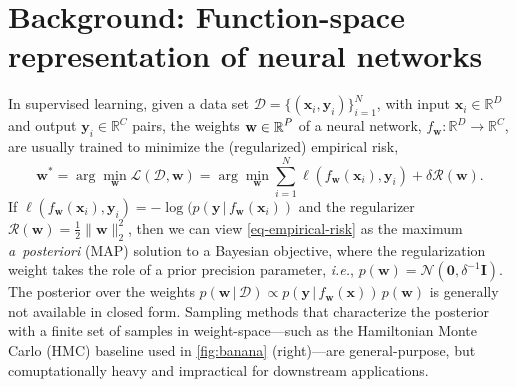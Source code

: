 \documentclass{article}
\makeatletter
\newcommand{\ie}{\textit{i.e.\@}\xspace}
\newcommand{\dataset}{\ensuremath{\mathcal{D}}}
\newcommand{\inputDomain}{\ensuremath{\mathbb{R}^{D}}}
\newcommand{\outputDomain}{\ensuremath{\mathbb{R}^{C}}}
\newcommand{\weights}{\ensuremath{\mathbf{w}}}
\newcommand{\mbf}[1]{\mathbf{#1}}
\renewcommand{\mid}{\,|\,}
\newcommand{\MI}{\mbf{I}}
\newcommand{\vzeros}{\mbf{0}}
\newcommand{\vx}{\mbf{x}}
\newcommand{\vy}{\mbf{y}}
\newcommand{\vw}{\mbf{w}}
\newcommand{\Norm}{\mathcal{N}}
\makeatother
\begin{document}
\section{Background: Function-space representation of neural networks}
\label{sec:methods}
%

%
In supervised learning, given a data set $\dataset = \{(\vx_{i} , \vy_{i})\}_{i=1}^{N}$, with input $\vx_i \in \inputDomain$ and output $\vy_i \in \outputDomain$ pairs, the weights $\weights \in \R^{P}$ of a neural network, $f_\mathbf{w} : \inputDomain \to \outputDomain$, are usually trained to minimize the (regularized) empirical risk,
%
\begin{equation} \label{eq-empirical-risk}
  \weights^{*} = 
  \arg \min_{\weights} \mathcal{L}(\dataset,\weights) =
  \arg \min_{\weights} \textstyle\sum_{i=1}^{N} \ell(f_\weights(\mathbf{x}_{i}), \mathbf{y}_i) + \delta \mathcal{R}(\weights).
\end{equation}
%
If $\ell(f_\weights(\vx_{i}), \vy_i) = -\log(p(\vy \mid f_\weights(\vx_{i}))$ and the regularizer $\mathcal{R}(\weights) = \frac{1}{2}\|\weights\|^{2}_2$, then we can view \cref{eq-empirical-risk} as the maximum {\it a~posteriori} (MAP) solution to a Bayesian objective, where the regularization weight takes the role of a prior precision parameter, \ie, $p(\vw) = \Norm(\vzeros, \delta^{-1} \MI)$.
The posterior over the weights ${p(\vw \mid \dataset) \propto p(\vy \mid f_{\weights}(\vx)) \, p(\weights)}$ is generally not available in closed form. Sampling methods that characterize the posterior with a finite set of samples in weight-space---such as the Hamiltonian Monte Carlo (HMC) baseline used in \cref{fig:banana} (right)---are general-purpose, but comuptationally heavy and impractical for downstream applications.
\end{document}
